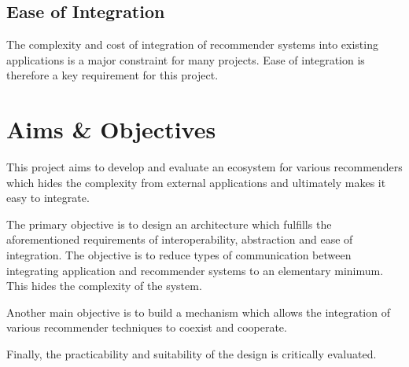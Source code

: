 \subsection{Ease of Integration}

The complexity and cost of integration of recommender systems into existing applications is a major constraint for many projects. Ease of integration is therefore a key requirement for this project.



\section{Aims \& Objectives}

This project aims to develop and evaluate an ecosystem for various recommenders which hides the complexity from external applications and ultimately makes it easy to integrate.

The primary objective is to design an architecture which fulfills the aforementioned requirements of interoperability, abstraction and ease of integration. The objective is to reduce types of communication between integrating application and recommender systems to an elementary minimum. This hides the complexity of the system.

Another main objective is to build a mechanism which allows the integration of various recommender techniques to coexist and cooperate.

Finally, the practicability and suitability of the design is critically evaluated.